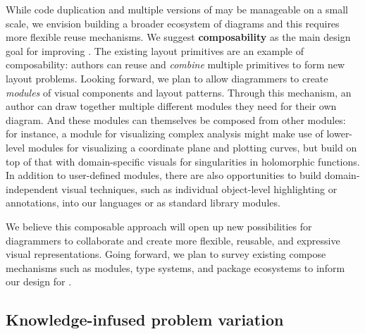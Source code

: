 While code duplication and multiple versions of \Style{} may be manageable on a small scale, we envision building a broader ecosystem of diagrams and this requires more flexible reuse mechanisms. We suggest \textbf{composability} as the main design goal for improving \Penrose{}. The existing layout primitives are an example of composability: authors can reuse and \emph{combine} multiple primitives to form new layout problems. Looking forward, we plan to allow diagrammers to create \emph{modules} of visual components and layout patterns. Through this mechanism, an author can draw together multiple different modules they need for their own diagram. And these modules can themselves be composed from other modules: for instance, a module for visualizing complex analysis might make use of lower-level modules for visualizing a coordinate plane and plotting curves, but build on top of that with domain-specific visuals for singularities in holomorphic functions. In addition to user-defined modules, there are also opportunities to build domain-independent visual techniques, such as individual object-level highlighting or annotations, into our languages or as standard library modules.

We believe this composable approach will open up new possibilities for diagrammers to collaborate and create more flexible, reusable, and expressive visual representations. Going forward, we plan to survey existing compose mechanisms such as modules, type systems, and package ecosystems to inform our design for \Penrose.


\subsection{Knowledge-infused problem variation}



